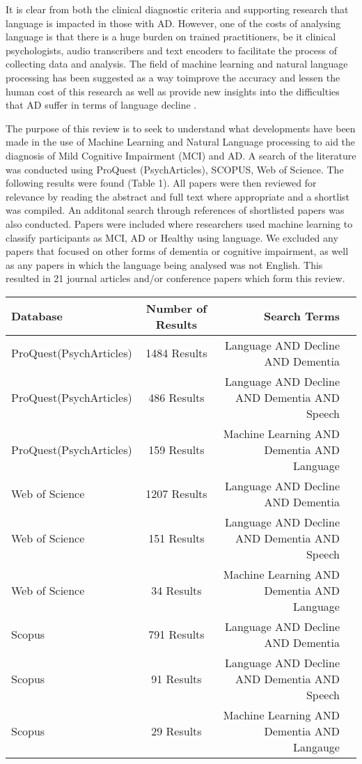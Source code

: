 \documentclass[a4paper]{article}
\begin{document}
\par
It is clear from both the clinical diagnostic criteria and supporting research that language is impacted in those with AD. However, one of the costs of analysing language is that there is a huge burden on trained practitioners, be it clinical psychologists, audio transcribers and text encoders to facilitate the process of collecting data and analysis. The field of machine learning and natural language processing has been suggested as a way toimprove the accuracy and lessen the human cost of this research as well as provide new insights into the difficulties that AD suffer in terms of language decline \cite{Boschi2017}. \newline
\par  
The purpose of this review is to seek to understand what developments have been made in the use of Machine Learning and Natural Language processing to aid the diagnosis of Mild Cognitive Impairment (MCI) and AD. A search of the literature was conducted using ProQuest (PsychArticles), SCOPUS, Web of Science. The following results were found (Table 1). All papers were then reviewed for relevance by reading the abstract and full text where appropriate and a shortlist was compiled. An additonal search through references of shortlisted papers was also conducted. Papers were included where researchers used machine learning to classify participants as MCI, AD or Healthy using language. We excluded any papers that focused on other forms of dementia or cognitive impairment, as well as any papers in which the language being analysed was not English. This resulted in 21 journal articles and/or conference papers which form this review.

\begin{center}
	\begin{tabular}{ | l | c | r | p{1cm} |}
		\hline
		Database & Number of Results & Search Terms  \\ \hline
		ProQuest(PsychArticles) & 1484 Results & Language AND Decline AND Dementia \\ \hline
		ProQuest(PsychArticles) & 486 Results  & Language AND Decline AND Dementia AND Speech \\ \hline
		ProQuest(PsychArticles) & 159 Results & Machine Learning AND Dementia AND Language \\ \hline
		Web of Science & 1207 Results  & Language AND Decline AND Dementia   \\ \hline
		Web of Science & 151 Results  & Language AND Decline AND Dementia AND Speech  \\ \hline
		Web of Science & 34 Results & Machine Learning AND Dementia AND Language \\ \hline
		Scopus & 791 Results & Language AND Decline AND Dementia  \\ \hline
		Scopus & 91 Results & Language AND Decline AND Dementia AND Speech   \\ \hline
		Scopus & 29 Results & Machine Learning AND Dementia AND Langauge \\ \hline
	\end{tabular}
\end{center}
\end{document}
